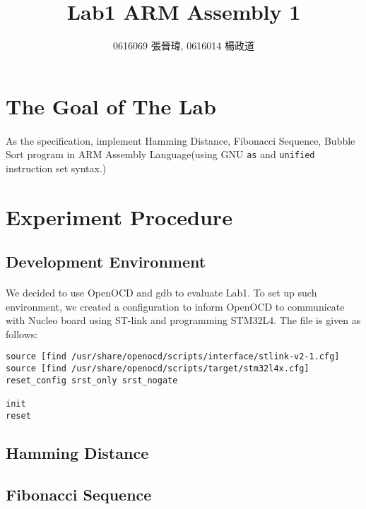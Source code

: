 \title{Lab1 ARM Assembly 1}
\author{0616069 張晉瑋, 0616014 楊政道}
\maketitle
\thispagestyle{fancy}
\section{The Goal of The Lab}
\paragraph{}
As the specification, implement Hamming Distance, Fibonacci Sequence, Bubble Sort program in ARM Assembly Language(using GNU \texttt{as} and \texttt{unified} instruction set syntax.)
\section{Experiment Procedure}
\subsection{Development Environment}
\paragraph{}
We decided to use OpenOCD and gdb to evaluate Lab1.
To set up such environment, we created a configuration to inform OpenOCD to communicate with Nucleo board using ST-link and programming STM32L4.
The file is given as follows:
\begin{lstlisting}
source [find /usr/share/openocd/scripts/interface/stlink-v2-1.cfg]
source [find /usr/share/openocd/scripts/target/stm32l4x.cfg]
reset_config srst_only srst_nogate

init
reset
\end{lstlisting}
\subsection{Hamming Distance}
\paragraph{}
\subsection{Fibonacci Sequence}
\paragraph{}
